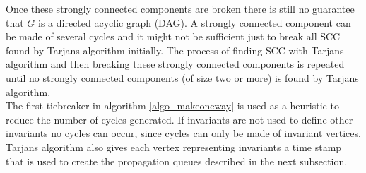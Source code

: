 Once these strongly connected components are broken there is still no guarantee that $G$ is a directed acyclic graph 
(DAG). A strongly connected component can be made of several cycles and it might not be sufficient just to break all 
SCC found by Tarjans algorithm initially. The process of finding SCC with Tarjans algorithm and then 
breaking these strongly connected components is repeated until no strongly connected components (of size two or more) 
is found by Tarjans algorithm. \medskip \\  
The first tiebreaker in algorithm \ref{algo_makeoneway} is used as a heuristic to reduce the number of cycles 
generated. If invariants are not used to define other invariants no cycles can occur, since cycles can only be made of 
invariant vertices. \\
Tarjans algorithm also gives each vertex representing invariants a time stamp that is used to create the propagation 
queues described in the next subsection.   \\






